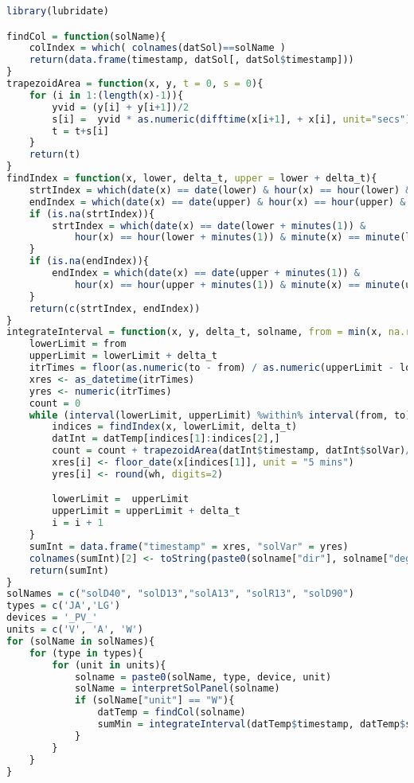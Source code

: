 \vspace{-3 mm}
\begin{lstlisting}[language=R]
library(lubridate)

findCol = function(solName){
    colIndex = which( colnames(datSol)==solName )
    return(data.frame(timestamp, datSol[, datSol$timestamp]))
}
trapezoidArea = function(x, y, t = 0, s = 0){ 
    for (i in 1:(length(x)-1)){
        yvid = (y[i] + y[i+1])/2
        s[i] =  yvid * as.numeric(difftime(x[i+1], + x[i], unit="secs"))
        t = t+s[i]
    }
    return(t)
}
findIndex = function(x, lower, delta_t, upper = lower + delta_t){
    strtIndex = which(date(x) == date(lower) & hour(x) == hour(lower) & minute(x) == minute(lower))[1]
    endIndex = which(date(x) == date(upper) & hour(x) == hour(upper) & minute(x) == minute(upper))[1]
    if (is.na(strtIndex)){
        strtIndex = which(date(x) == date(lower + minutes(1)) &
            hour(x) == hour(lower + minutes(1)) & minute(x) == minute(lower + minutes(1)))[1]
    }
    if (is.na(endIndex)){
        endIndex = which(date(x) == date(upper + minutes(1)) &
            hour(x) == hour(upper + minutes(1)) & minute(x) == minute(upper + minutes(1)))[1]
    }
    return(c(strtIndex, endIndex))
}
integrateInterval = function(x, y, delta_t, solname, from = min(x, na.rm=TRUE), to = max(x, na.rm=TRUE)){
    lowerLimit = from
    upperLimit = lowerLimit + delta_t    
    itrTimes = floor(as.numeric(to - from) / as.numeric(upperLimit - lowerLimit))
    xres <- as_datetime(itrTimes)
    yres <- numeric(itrTimes)
    count = 0
    while (interval(lowerLimit, upperLimit) %within% interval(from, to)) {
        indices = findIndex(x, lowerLimit, delta_t)
        datInt = datTemp[indices[1]:indices[2],]
        count = count + trapezoidArea(datInt$timestamp, datInt$solVar)/3600
        xres[i] <- floor_date(x[indices[1]], unit = "5 mins")
        yres[i] <- round(wh, digits=2)

        lowerLimit =  upperLimit
        upperLimit = upperLimit + delta_t
        i = i + 1      
    }
    sumInt = data.frame("timestamp" = xres, "solVar" = yres)
    colnames(sumInt)[2] <- toString(paste0(solname["dir"], solname["degree"], solname["type"]))
    return(sumInt)
}
solNames = c("solD40", "solD13","solA13", "solR13", "solD90")
types = c('JA','LG')
devices = '_PV_'
units = c('V', 'A', 'W')
for (solName in solNames){
    for (type in types){
        for (unit in units){
            solname = paste0(solName, type, device, unit)
            solName = interpretSolPanel(solname)
            if (solName["unit"] == "W"){
                datTemp = findCol(solname)
                sumMin = integrateInterval(datTemp$timestamp, datTemp$solVar, dminutes(5), "min", solname)
            }
        }
    }
}
\end{lstlisting}